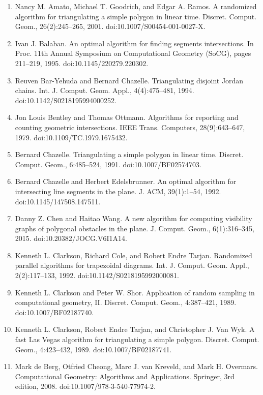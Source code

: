 \documentclass[10pt,a4paper]{article}
\begin{document}
\begin{enumerate}
\item[]  [1]  Nancy M. Amato, Michael T. Goodrich, and Edgar A. Ramos.  A randomized algorithm for triangulating a simple polygon in linear time.  Discret. Comput. Geom., 26(2):245–265, 2001.  doi:10.1007/S00454-001-0027-X.  
\item[]  [2]  Ivan J. Balaban.  An optimal algorithm for finding segments intersections.  In Proc. 11th Annual Symposium on Computational Geometry (SoCG), pages 211–219, 1995.  doi:10.1145/220279.220302.  
\item[]  [3]  Reuven Bar-Yehuda and Bernard Chazelle.  Triangulating disjoint Jordan chains.  Int. J. Comput. Geom. Appl., 4(4):475–481, 1994.  doi:10.1142/S0218195994000252.  
\item[]  [4]  Jon Louis Bentley and Thomas Ottmann.  Algorithms for reporting and counting geometric intersections.  IEEE Trans. Computers, 28(9):643–647, 1979.  doi:10.1109/TC.1979.1675432.  
\item[]  [5]  Bernard Chazelle.  Triangulating a simple polygon in linear time.  Discret. Comput. Geom., 6:485–524, 1991.  doi:10.1007/BF02574703.  
\item[]  [6]  Bernard Chazelle and Herbert Edelsbrunner.  An optimal algorithm for intersecting line segments in the plane.  J. ACM, 39(1):1–54, 1992.  doi:10.1145/147508.147511.  
\item[]  [7]  Danny Z. Chen and Haitao Wang.  A new algorithm for computing visibility graphs of polygonal obstacles in the plane.  J. Comput. Geom., 6(1):316–345, 2015.  doi:10.20382/JOCG.V6I1A14.  
\item[]  [8]  Kenneth L. Clarkson, Richard Cole, and Robert Endre Tarjan.  Randomized parallel algorithms for trapezoidal diagrams.  Int. J. Comput. Geom. Appl., 2(2):117–133, 1992.  doi:10.1142/S0218195992000081.  
\item[]  [9]  Kenneth L. Clarkson and Peter W. Shor.  Application of random sampling in computational geometry, II.  Discret. Comput. Geom., 4:387–421, 1989.  doi:10.1007/BF02187740.  
\item[]  [10]  Kenneth L. Clarkson, Robert Endre Tarjan, and Christopher J. Van Wyk.  A fast Las Vegas algorithm for triangulating a simple polygon.  Discret. Comput. Geom., 4:423–432, 1989.  doi:10.1007/BF02187741.  
\item[]  [11]  Mark de Berg, Otfried Cheong, Marc J. van Kreveld, and Mark H. Overmars.  Computational Geometry: Algorithms and Applications.  Springer, 3rd edition, 2008.  doi:10.1007/978-3-540-77974-2.  

\end{enumerate}
\end{document}
